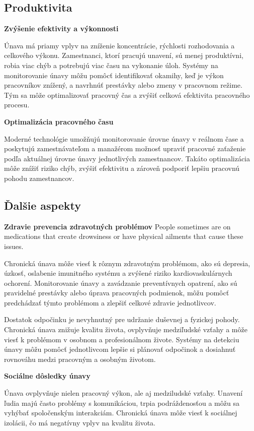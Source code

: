 \subsection{Produktivita}
\textbf{Zvýšenie efektivity a výkonnosti}

Únava má priamy vplyv na zníženie koncentrácie, rýchlosti rozhodovania a celkového výkonu. Zamestnanci, ktorí pracujú unavení, sú menej produktívni, robia viac chýb a potrebujú viac času na vykonanie úloh. Systémy na monitorovanie únavy môžu pomôcť identifikovať okamihy, keď je výkon pracovníkov znížený, a navrhnúť prestávky alebo zmeny v pracovnom režime. Tým sa môže optimalizovať pracovný čas a zvýšiť celková efektivita pracovného procesu.

\textbf{Optimalizácia pracovného času}

Moderné technológie umožňujú monitorovanie úrovne únavy v reálnom čase a poskytujú zamestnávateľom a manažérom možnosť upraviť pracovné zaťaženie podľa aktuálnej úrovne únavy jednotlivých zamestnancov. Takáto optimalizácia môže znížiť riziko chýb, zvýšiť efektivitu a zároveň podporiť lepšiu pracovnú pohodu zamestnancov.

\subsection{Ďalšie aspekty}

\textbf{Zdravie prevencia zdravotných problémov}
People sometimes are on medications that create drowsiness or have physical ailments that cause these issues.

Chronická únava môže viesť k rôznym zdravotným problémom, ako sú depresia, úzkosť, oslabenie imunitného systému a zvýšené riziko kardiovaskulárnych ochorení. Monitorovanie únavy a zavádzanie preventívnych opatrení, ako sú pravidelné prestávky alebo úprava pracovných podmienok, môžu pomôcť predchádzať týmto problémom a zlepšiť celkové zdravie jednotlivcov.

Dostatok odpočinku je nevyhnutný pre udržanie duševnej a fyzickej pohody. Chronická únava znižuje kvalitu života, ovplyvňuje medziľudské vzťahy a môže viesť k problémom v osobnom a profesionálnom živote. Systémy na detekciu únavy môžu pomôcť jednotlivcom lepšie si plánovať odpočinok a dosiahnuť rovnováhu medzi pracovným a osobným životom.

\textbf{Sociálne dôsledky únavy}

Únava ovplyvňuje nielen pracovný výkon, ale aj medziludské vzťahy. Unavení ľudia majú často problémy s komunikáciou, trpia podráždenosťou a môžu sa vyhýbať spoločenským interakciám. Chronická únava môže viesť k sociálnej izolácii, čo má negatívny vplyv na kvalitu života.


